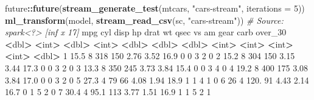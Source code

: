 \documentclass[
]{article}
\newenvironment{Shaded}{\begin{snugshade}}{\end{snugshade}}
\newcommand{\CommentTok}[1]{\textcolor[rgb]{0.56,0.35,0.01}{\textit{#1}}}
\newcommand{\DataTypeTok}[1]{\textcolor[rgb]{0.13,0.29,0.53}{#1}}
\newcommand{\DecValTok}[1]{\textcolor[rgb]{0.00,0.00,0.81}{#1}}
\newcommand{\ErrorTok}[1]{\textcolor[rgb]{0.64,0.00,0.00}{\textbf{#1}}}
\newcommand{\FloatTok}[1]{\textcolor[rgb]{0.00,0.00,0.81}{#1}}
\newcommand{\KeywordTok}[1]{\textcolor[rgb]{0.13,0.29,0.53}{\textbf{#1}}}
\newcommand{\NormalTok}[1]{#1}
\newcommand{\OperatorTok}[1]{\textcolor[rgb]{0.81,0.36,0.00}{\textbf{#1}}}
\newcommand{\StringTok}[1]{\textcolor[rgb]{0.31,0.60,0.02}{#1}}
\begin{document}
\begin{Shaded}
\begin{Highlighting}[]
\NormalTok{future}\OperatorTok{::}\KeywordTok{future}\NormalTok{(}\KeywordTok{stream_generate_test}\NormalTok{(mtcars, }\StringTok{"cars-stream"}\NormalTok{, }\DataTypeTok{iterations =} \DecValTok{5}\NormalTok{))}
\KeywordTok{ml_transform}\NormalTok{(model, }\KeywordTok{stream_read_csv}\NormalTok{(sc, }\StringTok{"cars-stream"}\NormalTok{))}
\CommentTok{# Source: spark<?> [inf x 17]}
\NormalTok{ mpg cyl disp hp drat wt qsec vs am gear carb over_}\DecValTok{30}
 \OperatorTok{<}\NormalTok{dbl}\OperatorTok{>}\StringTok{ }\ErrorTok{<}\NormalTok{int}\OperatorTok{>}\StringTok{ }\ErrorTok{<}\NormalTok{dbl}\OperatorTok{>}\StringTok{ }\ErrorTok{<}\NormalTok{int}\OperatorTok{>}\StringTok{ }\ErrorTok{<}\NormalTok{dbl}\OperatorTok{>}\StringTok{ }\ErrorTok{<}\NormalTok{dbl}\OperatorTok{>}\StringTok{ }\ErrorTok{<}\NormalTok{dbl}\OperatorTok{>}\StringTok{ }\ErrorTok{<}\NormalTok{int}\OperatorTok{>}\StringTok{ }\ErrorTok{<}\NormalTok{int}\OperatorTok{>}\StringTok{ }\ErrorTok{<}\NormalTok{int}\OperatorTok{>}\StringTok{ }\ErrorTok{<}\NormalTok{int}\OperatorTok{>}\StringTok{ }\ErrorTok{<}\NormalTok{dbl}\OperatorTok{>}
\StringTok{ }\DecValTok{1} \FloatTok{15.5} \DecValTok{8} \DecValTok{318} \DecValTok{150} \FloatTok{2.76} \FloatTok{3.52} \FloatTok{16.9} \DecValTok{0} \DecValTok{0} \DecValTok{3} \DecValTok{2} \DecValTok{0}
 \DecValTok{2} \FloatTok{15.2} \DecValTok{8} \DecValTok{304} \DecValTok{150} \FloatTok{3.15} \FloatTok{3.44} \FloatTok{17.3} \DecValTok{0} \DecValTok{0} \DecValTok{3} \DecValTok{2} \DecValTok{0}
 \DecValTok{3} \FloatTok{13.3} \DecValTok{8} \DecValTok{350} \DecValTok{245} \FloatTok{3.73} \FloatTok{3.84} \FloatTok{15.4} \DecValTok{0} \DecValTok{0} \DecValTok{3} \DecValTok{4} \DecValTok{0}
 \DecValTok{4} \FloatTok{19.2} \DecValTok{8} \DecValTok{400} \DecValTok{175} \FloatTok{3.08} \FloatTok{3.84} \FloatTok{17.0} \DecValTok{0} \DecValTok{0} \DecValTok{3} \DecValTok{2} \DecValTok{0}
 \DecValTok{5} \FloatTok{27.3} \DecValTok{4} \DecValTok{79} \DecValTok{66} \FloatTok{4.08} \FloatTok{1.94} \FloatTok{18.9} \DecValTok{1} \DecValTok{1} \DecValTok{4} \DecValTok{1} \DecValTok{0}
 \DecValTok{6} \DecValTok{26} \DecValTok{4} \FloatTok{120.} \DecValTok{91} \FloatTok{4.43} \FloatTok{2.14} \FloatTok{16.7} \DecValTok{0} \DecValTok{1} \DecValTok{5} \DecValTok{2} \DecValTok{0}
 \DecValTok{7} \FloatTok{30.4} \DecValTok{4} \FloatTok{95.1} \DecValTok{113} \FloatTok{3.77} \FloatTok{1.51} \FloatTok{16.9} \DecValTok{1} \DecValTok{1} \DecValTok{5} \DecValTok{2} \DecValTok{1}

\end{Highlighting}
\end{Shaded}
\end{document}

